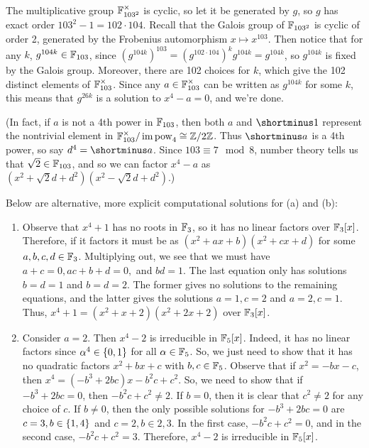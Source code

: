 \begin{solution}
\begin{enumerate}
    The multiplicative group $\mathbb{F}_{103^2}^{\times}$ is cyclic, so let it be generated by $g$, so $g$ has exact order $103^2-1 = 102\cdot 104$. Recall that the Galois group of $\mathbb{F}_{103^2}$ is cyclic of order 2, generated by the Frobenius automorphism $x \mapsto x^{103}$. Then notice that for any $k$, $g^{104k} \in \mathbb{F}_{103}$, since $(g^{104k})^{103} = (g^{102 \cdot 104})^k g^{104k} = g^{104k}$, so $g^{104k}$ is fixed by the Galois group. Moreover, there are 102 choices for $k$, which give the 102 distinct elements of $\mathbb{F}_{103}^{\times}$. Since any $a \in \mathbb{F}_{103}^{\times}$ can be written as $g^{104k}$ for some $k$, this means that $g^{26k}$ is a solution to $x^4-a=0$, and we're done.

    (In fact, if $a$ is not a 4th power in $\mathbb{F}_{103}$, then both $a$ and $\shortminus 1$ represent the nontrivial element in $\mathbb{F}_{103}^{\times} / \operatorname{im} \text{pow}_4 \cong \mathbb{Z}/2\mathbb{Z}$. Thus $\shortminus a$ is a 4th power, so say $d^4 = \shortminus a$. Since $103 \equiv 7 \mod 8$, number theory tells us that $\sqrt{2} \in \mathbb{F}_{103}$, and so we can factor $x^4-a$ as \newline$(x^2+\sqrt{2}d+d^2)(x^2-\sqrt{2}d+d^2)$.)
\end{enumerate}

Below are alternative, more explicit computational solutions for (a) and (b):
\begin{enumerate}
    \item Observe that $x^4+1$ has no roots in $\mathbb{F}_3$, so it has no linear factors over $\mathbb{F}_3[x]$. Therefore, if it factors it must be as $(x^2+ax+b)(x^2+cx+d)$ for some $a,b,c,d \in \mathbb{F}_3$. Multiplying out, we see that we must have $a+c=0, ac+b+d=0,$ and $bd=1$. The last equation only has solutions $b=d=1$ and $b=d=2$. The former gives no solutions to the remaining equations, and the latter gives the solutions $a=1,c=2$ and $a=2,c=1$. Thus, $x^4+1=(x^2+x+2)(x^2+2x+2)$ over $\mathbb{F}_3[x]$.
    \item Consider $a=2$. Then $x^4-2$ is irreducible in $\mathbb{F}_5[x]$. Indeed, it has no linear factors since $\alpha^4\in\{0,1\}$ for all $\alpha \in \mathbb{F}_5$. So, we just need to show that it has no quadratic factors $x^2+bx+c$ with $b,c \in \mathbb{F}_5$. Observe that if $x^2=-bx-c$, then $x^4 = (-b^3+2bc)x-b^2c+c^2$. So, we need to show that if $-b^3+2bc=0$, then $-b^2c+c^2 \neq 2$. If $b=0$, then it is clear that $c^2 \neq 2$ for any choice of $c$. If $b\neq 0$, then the only possible solutions for $-b^3+2bc=0$ are $c = 3, b \in \{1,4\}$ and $c = 2, b \in {2,3}$. In the first case, $-b^2c+c^2=0$, and in the second case, $-b^2c+c^2=3$. Therefore, $x^4-2$ is irreducible in $\mathbb{F}_5[x]$.
\end{enumerate}
\end{solution}

